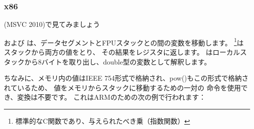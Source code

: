 ﻿\subsubsection{x86}

(MSVC 2010)で見てみましょう




\FLD および \FSTP は、データセグメントとFPUスタックとの間の変数を移動します。
 \footnote{標準的なC関数であり、与えられたべき乗（指数関数）}はスタックから両方の値をとり、
その結果をレジスタに返します。  \printf はローカルスタックから8バイトを取り出し、double型の変数として解釈します。

ちなみに、メモリ内の値はIEEE 754形式で格納され、pow()もこの形式で格納されているため、
値をメモリからスタックに移動するための一対の \MOV 命令を使用でき、変換は不要です。
これはARMのための次の例で行われます：

